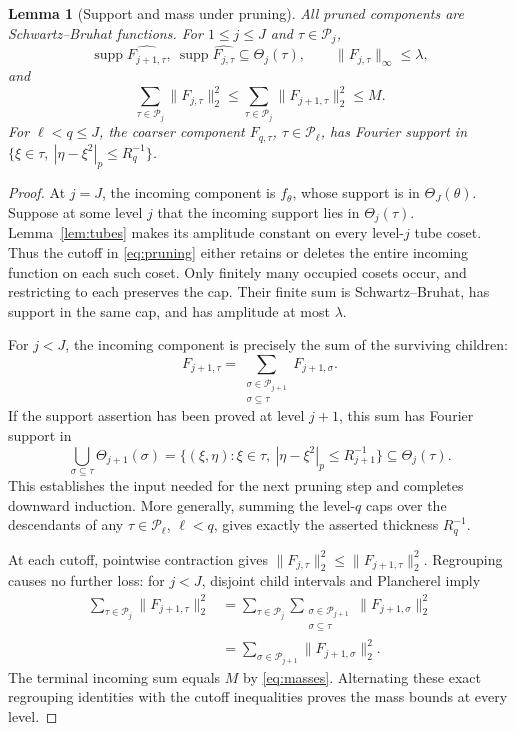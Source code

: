 \documentclass[11pt,twoside,a4paper]{article}
\numberwithin{equation}{section}
\newtheorem{lemma}[theorem]{Lemma}
\theoremstyle{definition}
\newcommand{\cP}{\mathcal P}
\newcommand{\supp}{\operatorname{supp}}
\begin{document}
\begin{lemma}[Support and mass under pruning]\label{lem:pruning}
All pruned components are Schwartz--Bruhat functions. For $1\le j\le J$ and $\tau\in\cP_j$,
$$
\supp\widehat{F_{j+1,\tau}},\ \supp\widehat{F_{j,\tau}}\subseteq\Theta_j(\tau),
\qquad \|F_{j,\tau}\|_\infty\le\lambda,
$$
and
$$
\sum_{\tau\in\cP_j}\|F_{j,\tau}\|_2^2
\le\sum_{\tau\in\cP_j}\|F_{j+1,\tau}\|_2^2\le M.
$$
For $\ell<q\le J$, the coarser component $F_{q,\tau}$, $\tau\in\cP_\ell$, has Fourier support in $\{\xi\in\tau,\ |\eta-\xi^2|_p\le R_q^{-1}\}$.
\end{lemma}
\begin{proof}
At $j=J$, the incoming component is $f_\theta$, whose support is in $\Theta_J(\theta)$. Suppose at some level $j$ that the incoming support lies in $\Theta_j(\tau)$. Lemma~\ref{lem:tubes} makes its amplitude constant on every level-$j$ tube coset. Thus the cutoff in \eqref{eq:pruning} either retains or deletes the entire incoming function on each such coset. Only finitely many occupied cosets occur, and restricting to each preserves the cap. Their finite sum is Schwartz--Bruhat, has support in the same cap, and has amplitude at most $\lambda$.

For $j<J$, the incoming component is precisely the sum of the surviving children:
$$
F_{j+1,\tau}
=\sum_{\substack{\sigma\in\cP_{j+1}\\\sigma\subseteq\tau}}F_{j+1,\sigma}.
$$
If the support assertion has been proved at level $j+1$, this sum has Fourier support in
$$
\bigcup_{\sigma\subseteq\tau}\Theta_{j+1}(\sigma)
=\{(\xi,\eta):\xi\in\tau,\ |\eta-\xi^2|_p\le R_{j+1}^{-1}\}
\subseteq\Theta_j(\tau).
$$
This establishes the input needed for the next pruning step and completes downward induction. More generally, summing the level-$q$ caps over the descendants of any $\tau\in\cP_\ell$, $\ell<q$, gives exactly the asserted thickness $R_q^{-1}$.

At each cutoff, pointwise contraction gives $\|F_{j,\tau}\|_2^2\le\|F_{j+1,\tau}\|_2^2$. Regrouping causes no further loss: for $j<J$, disjoint child intervals and Plancherel imply
$$
\begin{aligned}
\sum_{\tau\in\cP_j}\|F_{j+1,\tau}\|_2^2
&=\sum_{\tau\in\cP_j}\sum_{\substack{\sigma\in\cP_{j+1}\\\sigma\subseteq\tau}}
\|F_{j+1,\sigma}\|_2^2\\
&=\sum_{\sigma\in\cP_{j+1}}\|F_{j+1,\sigma}\|_2^2.
\end{aligned}
$$
The terminal incoming sum equals $M$ by \eqref{eq:masses}. Alternating these exact regrouping identities with the cutoff inequalities proves the mass bounds at every level.
\end{proof}
\end{document}
